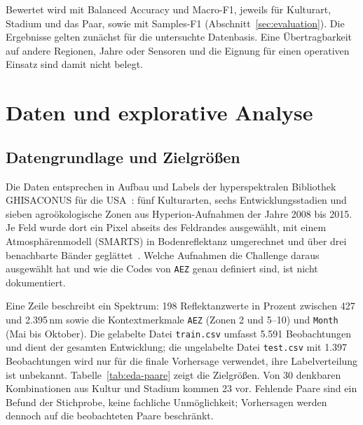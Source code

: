 \documentclass[11pt,a4paper,titlepage]{article}
\begin{document}
Bewertet wird mit Balanced Accuracy und Macro-F1, jeweils f\"ur Kulturart,
Stadium und das Paar, sowie mit Samples-F1 (Abschnitt~\ref{sec:evaluation}).
Die Ergebnisse gelten zun\"achst f\"ur die untersuchte Datenbasis.
Eine \"Ubertragbarkeit auf andere Regionen, Jahre oder Sensoren und die
Eignung f\"ur einen operativen Einsatz sind damit nicht belegt.

\section{Daten und explorative Analyse}
\label{sec:daten}

\subsection{Datengrundlage und Zielgr\"o\ss en}

Die Daten entsprechen in Aufbau und Labels der hyperspektralen Bibliothek
GHISACONUS f\"ur die USA~\cite{thenkabail2019,aneece2018}: f\"unf Kulturarten,
sechs Entwicklungsstadien und sieben agro\"okologische Zonen aus
Hyperion-Aufnahmen der Jahre 2008 bis 2015. Je Feld wurde dort ein Pixel
abseits des Feldrandes ausgew\"ahlt, mit einem Atmosph\"arenmodell (SMARTS) in
Bodenreflektanz umgerechnet und \"uber drei benachbarte B\"ander gegl\"attet~\cite{aneece2018}. Welche Aufnahmen die Challenge daraus ausgew\"ahlt hat und
wie die Codes von \texttt{AEZ} genau definiert sind, ist nicht dokumentiert.

Eine Zeile beschreibt ein Spektrum: 198 Reflektanzwerte in Prozent zwischen
427 und 2.395\,nm sowie die Kontextmerkmale \texttt{AEZ} (Zonen 2 und 5--10)
und \texttt{Month} (Mai bis Oktober). Die gelabelte Datei \texttt{train.csv}
umfasst 5.591 Beobachtungen und dient der gesamten Entwicklung; die
ungelabelte Datei \texttt{test.csv} mit 1.397 Beobachtungen wird nur f\"ur die
finale Vorhersage verwendet, ihre Labelverteilung ist unbekannt.
Tabelle~\ref{tab:eda-paare} zeigt die Zielgr\"o\ss en. Von 30 denkbaren
Kombinationen aus Kultur und Stadium kommen 23 vor. Fehlende Paare sind ein
Befund der Stichprobe, keine fachliche Unm\"oglichkeit; Vorhersagen werden
dennoch auf die beobachteten Paare beschr\"ankt.
\end{document}
